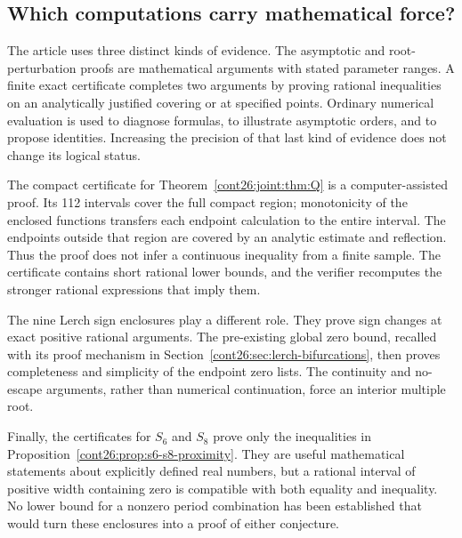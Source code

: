 \documentclass[11pt,letterpaper]{article}
\numberwithin{equation}{section}
\theoremstyle{plain}
\theoremstyle{definition}
\theoremstyle{remark}
\begin{document}
\subsection{Which computations carry mathematical force?}

The article uses three distinct kinds of evidence. The asymptotic and
root-perturbation proofs are mathematical arguments with stated parameter
ranges. A finite exact certificate completes two arguments by proving
rational inequalities on an analytically justified covering or at
specified points. Ordinary numerical evaluation is used to diagnose
formulas, to illustrate asymptotic orders, and to propose identities.
Increasing the precision of that last kind of evidence does not change
its logical status.

The compact certificate for Theorem~\ref{cont26:joint:thm:Q} is a
computer-assisted proof. Its 112 intervals cover the full compact
region; monotonicity of the enclosed functions transfers each endpoint
calculation to the entire interval. The endpoints outside that region
are covered by an analytic estimate and reflection. Thus the proof
does not infer a continuous inequality from a finite sample.
The certificate contains short rational lower bounds, and the verifier
recomputes the stronger rational expressions that imply them.

The nine Lerch sign enclosures play a different role. They prove
sign changes at exact positive rational arguments. The pre-existing
global zero bound, recalled with its proof mechanism in
Section~\ref{cont26:sec:lerch-bifurcations}, then proves completeness and
simplicity of the endpoint zero lists. The continuity and no-escape
arguments, rather than numerical continuation, force an interior
multiple root.

Finally, the certificates for $S_6$ and $S_8$ prove only the inequalities
in Proposition~\ref{cont26:prop:s6-s8-proximity}. They are useful mathematical
statements about explicitly defined real numbers, but a rational
interval of positive width containing zero is compatible with both
equality and inequality. No lower bound for a nonzero period
combination has been established that would turn these enclosures
into a proof of either conjecture.
\end{document}
